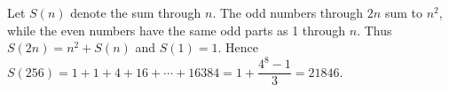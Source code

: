 Let $ S(n)$ denote the sum through $ n $. The odd numbers through $ 2n $ sum to $ n^2 $, while the even numbers have the same odd parts as 1 through $ n $. Thus $ S(2n)=n^2+S(n)$ and $ S(1)=1 $. Hence $ S(256)=1+1+4+16+\cdots+16384=1+\dfrac{4^8-1}{3}=\boxed{21846}$.
